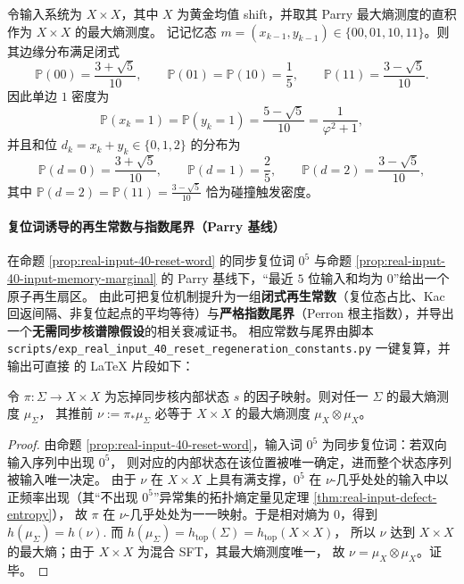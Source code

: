 \begin{proposition}[最大熵测度下的输入记忆边缘分布（闭式）]\label{prop:real-input-40-input-memory-marginal}
令输入系统为 $X\times X$，其中 $X$ 为黄金均值 shift，并取其 Parry 最大熵测度的直积作为 $X\times X$ 的最大熵测度。
记记忆态 $m=(x_{k-1},y_{k-1})\in\{00,01,10,11\}$。则其边缘分布满足闭式
\[
\mathbb{P}(00)=\frac{3+\sqrt5}{10},\qquad
\mathbb{P}(01)=\mathbb{P}(10)=\frac15,\qquad
\mathbb{P}(11)=\frac{3-\sqrt5}{10}.
\]
因此单边 $1$ 密度为
\[
\mathbb{P}(x_k=1)=\mathbb{P}(y_k=1)=\frac{5-\sqrt5}{10}=\frac{1}{\varphi^2+1},
\]
并且和位 $d_k=x_k+y_k\in\{0,1,2\}$ 的分布为
\[
\mathbb{P}(d=0)=\frac{3+\sqrt5}{10},\qquad
\mathbb{P}(d=1)=\frac25,\qquad
\mathbb{P}(d=2)=\frac{3-\sqrt5}{10},
\]
其中 $\mathbb{P}(d=2)=\mathbb{P}(11)=\frac{3-\sqrt5}{10}$ 恰为碰撞触发密度。
\end{proposition}

\paragraph{复位词诱导的再生常数与指数尾界（Parry 基线）}
在命题 \ref{prop:real-input-40-reset-word} 的同步复位词 $0^5$ 与命题 \ref{prop:real-input-40-input-memory-marginal} 的 Parry 基线下，“最近 $5$ 位输入和均为 $0$”给出一个原子再生扇区。
由此可把复位机制提升为一组\textbf{闭式再生常数}（复位态占比、Kac 回返间隔、非复位起点的平均等待）与\textbf{严格指数尾界}（Perron 根主指数），并导出一个\textbf{无需同步核谱隙假设}的相关衰减证书。
相应常数与尾界由脚本 \texttt{scripts/exp\_real\_input\_40\_reset\_regeneration\_constants.py} 一键复算，并输出可直接 \verb|| 的 \LaTeX{} 片段如下：


\begin{proposition}[最大熵测度的输入投影刚性]\label{prop:real-input-40-input-measure-rigid}
令 $\pi:\Sigma\to X\times X$ 为忘掉同步核内部状态 $s$ 的因子映射。则对任一 $\Sigma$ 的最大熵测度 $\mu_\Sigma$，
其推前 $\nu:=\pi_\ast\mu_\Sigma$ 必等于 $X\times X$ 的最大熵测度 $\mu_X\otimes\mu_X$。
\end{proposition}
\begin{proof}
由命题 \ref{prop:real-input-40-reset-word}，输入词 $0^5$ 为同步复位词：若双向输入序列中出现 $0^5$，
则对应的内部状态在该位置被唯一确定，进而整个状态序列被输入唯一决定。
由于 $\nu$ 在 $X\times X$ 上具有满支撑，$0^5$ 在 $\nu$-几乎处处的输入中以正频率出现（其“不出现 $0^5$”异常集的拓扑熵定量见定理 \ref{thm:real-input-defect-entropy}），
故 $\pi$ 在 $\nu$-几乎处处为一一映射。于是相对熵为 $0$，得到
\(
h(\mu_\Sigma)=h(\nu).
\)
而 $h(\mu_\Sigma)=h_{\mathrm{top}}(\Sigma)=h_{\mathrm{top}}(X\times X)$，
所以 $\nu$ 达到 $X\times X$ 的最大熵；由于 $X\times X$ 为混合 SFT，其最大熵测度唯一，
故 $\nu=\mu_X\otimes\mu_X$。证毕。
\end{proof}


